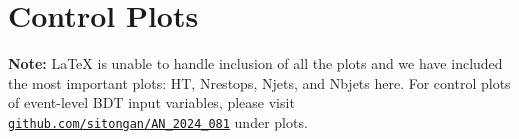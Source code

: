 \documentclass[twoside]{article}
\begin{document}
\clearpage

\appendix
{}
\section{Control Plots}
\noindent\textbf{Note:} LaTeX is unable to handle inclusion of all the plots and we have included the most important plots: HT, Nrestops, Njets, and Nbjets here. For control plots of event-level BDT input variables, please visit
\href{https://github.com/sitongan/AN_2024_081}{\texttt{github.com/sitongan/AN\_2024\_081}} under plots.
\end{document}
